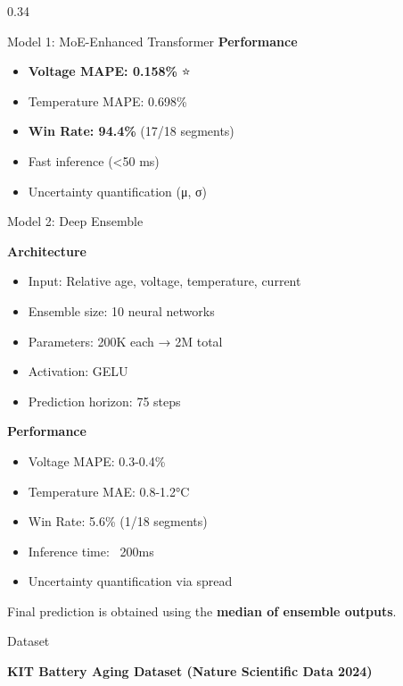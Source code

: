 \documentclass[final]{beamer}
\begin{document}
\begin{frame}[t]
\begin{columns}[t]
\begin{column}{0.34\textwidth}
\begin{block}{Model 1: MoE-Enhanced Transformer}
\textbf{Performance}

\begin{itemize}
\item \textbf{Voltage MAPE: 0.158\%} ⭐
\item Temperature MAPE: 0.698\%
\item \textbf{Win Rate: 94.4\%} (17/18 segments)
\item Fast inference (<50 ms)
\item Uncertainty quantification (μ, σ)
\end{itemize}

\end{block}

\vspace{1cm}

\begin{block}{Model 2: Deep Ensemble}

\textbf{Architecture}

\begin{itemize}
\item Input: Relative age, voltage, temperature, current
\item Ensemble size: 10 neural networks
\item Parameters: 200K each → 2M total
\item Activation: GELU
\item Prediction horizon: 75 steps
\end{itemize}

\textbf{Performance}

\begin{itemize}
\item Voltage MAPE: 0.3-0.4\%
\item Temperature MAE: 0.8-1.2°C
\item Win Rate: 5.6\% (1/18 segments)
\item Inference time: ~200ms
\item Uncertainty quantification via spread
\end{itemize}

Final prediction is obtained using the \textbf{median of ensemble outputs}.

\end{block}

\vspace{1cm}

\begin{alertblock}{Dataset}

\textbf{KIT Battery Aging Dataset (Nature Scientific Data 2024)}


\end{alertblock}
\end{column}
\end{columns}
\end{frame}
\end{document}
